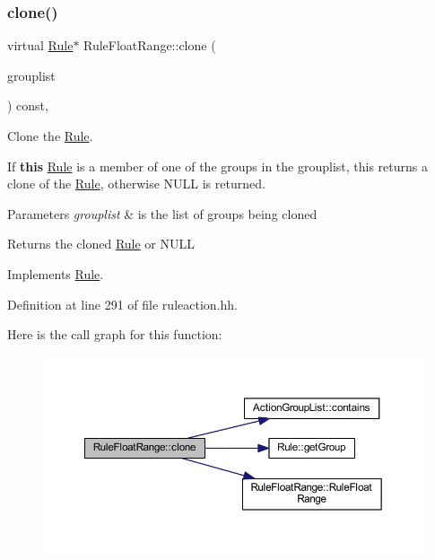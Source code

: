 \subsubsection{\texorpdfstring{clone()}{clone()}}
{\footnotesize\ttfamily virtual \mbox{\hyperlink{class_rule}{Rule}}$\ast$ Rule\+Float\+Range\+::clone (\begin{DoxyParamCaption}\item[{const \mbox{\hyperlink{class_action_group_list}{Action\+Group\+List}} \&}]{grouplist }\end{DoxyParamCaption}) const\hspace{0.3cm}{\ttfamily [inline]}, {\ttfamily [virtual]}}



Clone the \mbox{\hyperlink{class_rule}{Rule}}. 

If {\bfseries{this}} \mbox{\hyperlink{class_rule}{Rule}} is a member of one of the groups in the grouplist, this returns a clone of the \mbox{\hyperlink{class_rule}{Rule}}, otherwise N\+U\+LL is returned. 
\begin{DoxyParams}{Parameters}
{\em grouplist} & is the list of groups being cloned \\
\hline
\end{DoxyParams}
\begin{DoxyReturn}{Returns}
the cloned \mbox{\hyperlink{class_rule}{Rule}} or N\+U\+LL 
\end{DoxyReturn}


Implements \mbox{\hyperlink{class_rule_a70de90a76461bfa7ea0b575ce3c11e4d}{Rule}}.



Definition at line 291 of file ruleaction.\+hh.

Here is the call graph for this function\+:
\nopagebreak
\begin{figure}[H]
\begin{center}
\leavevmode
\includegraphics[width=350pt]{class_rule_float_range_a31ef31a3d85c60fbf0a3e64e48e2f0bd_cgraph}
\end{center}
\end{figure}
\mbox{\label{class_rule_float_range_a7eadff5b3fdebe17ca72c9ec23cb0484}} 
